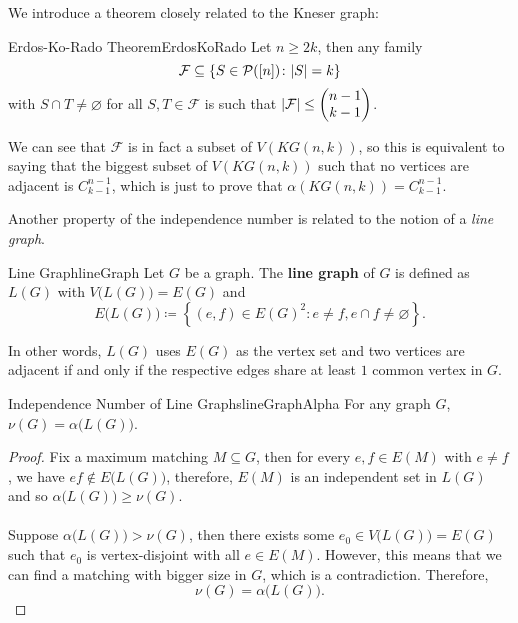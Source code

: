 \documentclass[math, code]{amznotes}
\theoremstyle{remark}
\begin{document}
We introduce a theorem closely related to the Kneser graph:
\begin{thmbox}{Erdos-Ko-Rado Theorem}{ErdosKoRado}
    Let $n \geq 2k$, then any family
    \begin{equation*}
        \mathcal{F} \subseteq \left\{S \in \mathcal{P}([n]) \colon {\left\lvert {S} \right\rvert} = k\right\}
    \end{equation*}
    with $S \cap T \neq \varnothing$ for all $S, T \in \mathcal{F}$ is such that ${\left\lvert {\mathcal{F}} \right\rvert} \leq \begin{pmatrix}
        n - 1 \\
        k - 1
    \end{pmatrix}$.
\end{thmbox}
We can see that $\mathcal{F}$ is in fact a subset of $V(KG(n, k))$, so this is equivalent to saying that the biggest subset of $V(KG(n, k))$ such that no vertices are adjacent is $C^{n - 1}_{k - 1}$, which is just to prove that $\alpha(KG(n, k)) = C^{n - 1}_{k - 1}$.

Another property of the independence number is related to the notion of a \textit{line graph}.
\begin{dfnbox}{Line Graph}{lineGraph}
    Let $G$ be a graph. The {\color{red} \textbf{line graph}} of $G$ is defined as $L(G)$ with $V\bigl(L(G)\bigr) = E(G)$ and
    \begin{equation*}
        E\bigl(L(G)\bigr) \coloneqq \left\{(e, f) \in E(G)^2 \colon e \neq f, e \cap f \neq \varnothing\right\}.
    \end{equation*}
\end{dfnbox}
In other words, $L(G)$ uses $E(G)$ as the vertex set and two vertices are adjacent if and only if the respective edges share at least $1$ common vertex in $G$.
\begin{probox}{Independence Number of Line Graphs}{lineGraphAlpha}
    For any graph $G$, $\nu(G) = \alpha\bigl(L(G)\bigr)$.
    \tcblower
    \begin{proof}
        Fix a maximum matching $M \subseteq G$, then for every $e, f \in E(M)$ with $e \neq f$, we have $ef \notin E\bigl(L(G)\bigr)$, therefore, $E(M)$ is an independent set in $L(G)$ and so $\alpha\bigl(L(G)\bigr) \geq \nu(G)$.
        \\\\
        Suppose $\alpha\bigl(L(G)\bigr) > \nu(G)$, then there exists some $e_0 \in V\bigl(L(G)\bigr) = E(G)$ such that $e_0$ is vertex-disjoint with all $e \in E(M)$. However, this means that we can find a matching with bigger size in $G$, which is a contradiction. Therefore, 
        \begin{equation*}
            \nu(G) = \alpha\bigl(L(G)\bigr).
        \end{equation*}
    \end{proof}
\end{probox}
\end{document}
